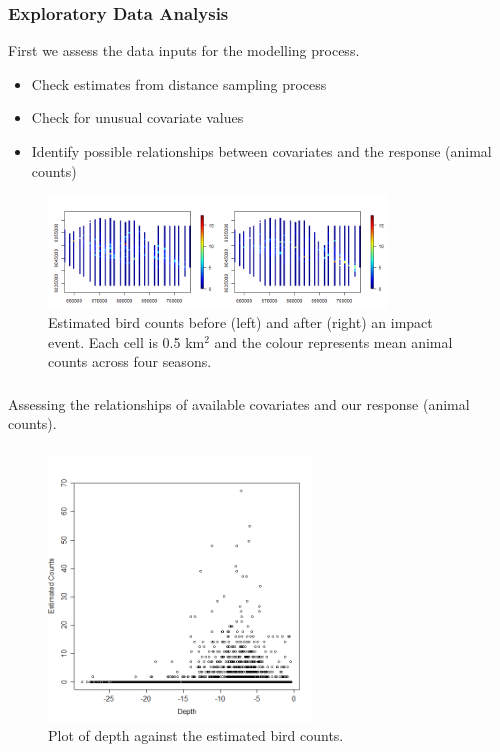 \begin{frame}[fragile]
\frametitle{Exploratory Data Analysis}
First we assess the data inputs for the modelling process.
\begin{itemize}
\item Check estimates from distance sampling process
\item Check for unusual covariate values
\item Identify possible relationships between covariates and the response (animal counts)
\end{itemize}

\begin{figure}[h]
\centering
  \includegraphics[width=9cm]{nhats.png}
\caption{Estimated bird counts before (left) and after (right) an impact event.  Each cell is 0.5 km$^2$ and the colour represents mean animal counts across four seasons.}
\label{fig:rawnhats}
\end{figure}
\end{frame}


\begin{frame}
\frametitle{}
Assessing the relationships of available covariates and our response (animal counts).
\end{frame}

\begin{frame}
\frametitle{}
\begin{figure}[h]
  \centering
  \includegraphics[width=7cm]{depth.png}
\caption{Plot of depth against the estimated bird counts.}
\label{fig:exploratory1}
\end{figure}
\end{frame}

